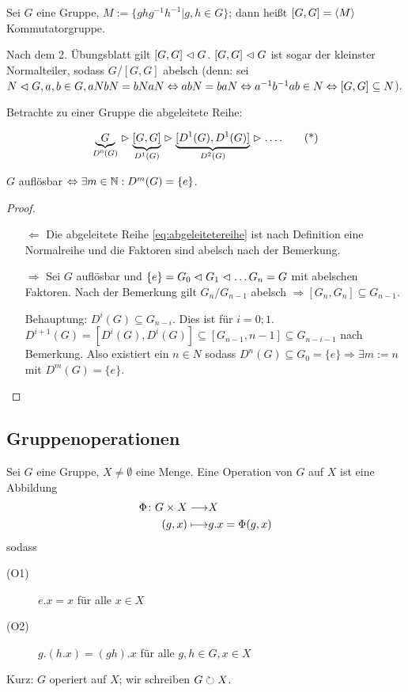\documentclass[12pt,a4paper]{scrartcl}
\begin{document}
\begin{defi}
	Sei $G$ eine Gruppe, $M := \{ghg^{-1}h^{-1}|g,h\in G\}$; dann heißt $[G,G] = \langle M\rangle$ Kommutatorgruppe.
\end{defi}

\begin{bem}
	Nach dem 2. Übungsblatt gilt $[G,G] \vartriangleleft G$. $[G,G]\vartriangleleft G$ ist sogar der kleinster Normalteiler, sodass $G/[G,G]$ abelsch (denn: sei $N\vartriangleleft G, a,b\in G, aNbN = bNaN\Leftrightarrow abN = baN\Leftrightarrow a^{-1}b^{-1}ab\in N\Leftrightarrow [G,G]\subseteq N$).
\end{bem}

\noindent
Betrachte zu einer Gruppe die abgeleitete Reihe:

\begin{equation}
\underbrace{G}_{D^0(G)} \vartriangleright \underbrace{[G,G]}_{D^1(G)} \vartriangleright \underbrace{[D^1(G),D^1(G)]}_{D^2(G)} \vartriangleright \ldots . \tag{*}\label{eq:abgeleitetereihe}
\end{equation}

\begin{satz}
	$G$ auflösbar $\Leftrightarrow \exists m\in\mathbb N : D^m(G) = \{e\}$.
\end{satz}
\begin{proof}
	\leavevmode
	\begin{itemize}
		\item [\glqq $\Leftarrow$\grqq] Die abgeleitete Reihe \eqref{eq:abgeleitetereihe} ist nach Definition eine Normalreihe und die Faktoren sind abelsch nach der Bemerkung.
		\item [\glqq $\Rightarrow$\grqq] Sei $G$ auflösbar und $\{e\} = G_0\vartriangleleft G_1\vartriangleleft\dots G_n = G$ mit abelschen Faktoren. Nach der Bemerkung gilt $G_n/G_{n-1}$ abelsch $\Rightarrow [G_n,G_n]\subseteq G_{n-1}$.
		
		Behauptung: $D^i(G) \subseteq G_{n-i}$. Dies ist für $i = 0;1$. $D^{i+1}(G) = [D^i(G), D^i(G)]\subseteq [G_{n-1},{n-1}]\subseteq G_{n-i-1}$ nach Bemerkung. Also existiert ein $n\in N$ sodass $D^n(G) \subseteq G_0 = \{e\}\Rightarrow \exists m:=n$ mit $D^m(G) =\{e\}$.	
	\end{itemize}
\end{proof}


\subsection{Gruppenoperationen}
\begin{defi}
	Sei $G$ eine Gruppe, $X\neq \emptyset$ eine Menge. Eine Operation von $G$ auf $X$ ist eine Abbildung
	\begin{align*}
		\Phi\colon G\times X \longrightarrow & X\\
		(g,x) \longmapsto & g.x = \Phi(g,x)
	\end{align*}
	sodass
	\begin{description}
		\item[(O1)] $e.x = x$ für alle $x\in X$
		\item[(O2)] $g.(h.x) = (gh).x$ für alle $g,h\in G, x\in X$
	\end{description}
	Kurz: $G$ operiert auf $X$; wir schreiben $G\circlearrowright X$.
\end{defi}
\end{document}

